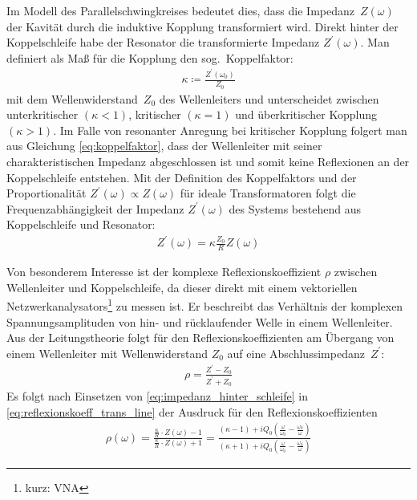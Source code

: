 Im Modell des Parallelschwingkreises bedeutet dies, dass die Impedanz~$Z(\omega)$ der Kavität durch die induktive Kopplung transformiert wird.
Direkt hinter der Koppelschleife habe der Resonator die transformierte Impedanz $Z^\prime(\omega)$.
Man definiert als Maß für die Kopplung den sog.\ Koppelfaktor:
\begin{align}
  \kappa \coloneqq \frac{Z^\prime(\omega_0)}{Z_0}
  \label{eq:koppelfaktor}
\end{align}
mit dem Wellenwiderstand~$Z_0$ des Wellenleiters und unterscheidet zwischen unterkritischer $(\kappa < 1)$, kritischer $(\kappa = 1)$ und überkritischer Kopplung $(\kappa > 1)$.
Im Falle von resonanter Anregung bei kritischer Kopplung folgert man aus Gleichung \eqref{eq:koppelfaktor}, dass der Wellenleiter mit seiner charakteristischen Impedanz abgeschlossen ist und somit keine Reflexionen an der Koppelschleife entstehen.
Mit der Definition des Koppelfaktors und der Proportionalität $Z^\prime(\omega) \propto Z(\omega)$ für ideale Transformatoren folgt die Frequenzabhängigkeit der Impedanz $Z^\prime(\omega)$ des Systems bestehend aus Koppelschleife und Resonator:
\begin{align}
  Z^\prime(\omega) = \kappa \frac{Z_0}{R} Z(\omega)
  \label{eq:impedanz_hinter_schleife}
\end{align}

Von besonderem Interesse ist der komplexe Reflexionskoeffizient $\rho$ zwischen Wellenleiter und Koppelschleife, da dieser direkt mit einem vektoriellen Netzwerkanalysators\footnote{kurz: VNA} zu messen ist.
Er beschreibt das Verhältnis der komplexen Spannungsamplituden von hin- und rücklaufender Welle in einem Wellenleiter.
Aus der Leitungstheorie \cite[S.\ 57]{pozar} folgt für den Reflexionskoeffizienten am Übergang von einem Wellenleiter mit Wellenwiderstand $Z_0$ auf eine Abschlussimpedanz~$Z^\prime$:
\begin{align}
  \rho = \frac{Z^\prime - Z_0}{Z^\prime + Z_0}
  \label{eq:reflexionskoeff_trans_line}
\end{align}
Es folgt nach Einsetzen von \eqref{eq:impedanz_hinter_schleife} in \eqref{eq:reflexionskoeff_trans_line} der Ausdruck für den Reflexionskoeffizienten 
\begin{align}
  \rho(\omega) = \frac{\frac{\kappa}{R} \cdot Z(\omega) - 1}{\frac{\kappa}{R} \cdot Z(\omega) + 1} = \frac{(\kappa - 1) + i  Q_0 \left( \frac{\omega}{\omega_0}  - \frac{\omega_0}{\omega}\right)}{\left( \kappa + 1 \right) + i  Q_0 \left( \frac{\omega}{\omega_0}  - \frac{\omega_0}{\omega}\right)}
\end{align}


